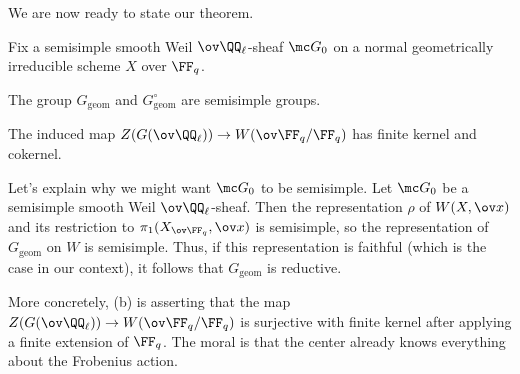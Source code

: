 \documentclass[../notes.tex]{subfiles}
\begin{document}
We are now ready to state our theorem.
\begin{theorem} \label{thm:semisimple-monodromy}
	Fix a semisimple smooth Weil $\ov\QQ_\ell$-sheaf $\mc G_0$ on a normal geometrically irreducible sch\-eme $X$ over $\FF_q$.
	\begin{listalph}
		\item The group $G_{\mathrm{geom}}$ and $G_{\mathrm{geom}}^\circ$ are semisimple groups.
		\item The induced map $Z(G(\ov\QQ_\ell))\to W(\ov\FF_q/\FF_q)$ has finite kernel and cokernel.
	\end{listalph}
\end{theorem}
\begin{remark}
	Let's explain why we might want $\mc G_0$ to be semisimple. Let $\mc G_0$ be a semisimple smooth Weil $\ov\QQ_\ell$-sheaf. Then the representation $\rho$ of $W(X,\ov x)$ and its restriction to $\pi_1(X_{\ov\FF_q},\ov x)$ is semisimple, so the representation of $G_{\mathrm{geom}}$ on $W$ is semisimple. Thus, if this representation is faithful (which is the case in our context), it follows that $G_{\mathrm{geom}}$ is reductive.
\end{remark}
\begin{remark}
	More concretely, (b) is asserting that the map $Z(G(\ov\QQ_\ell))\to W(\ov\FF_q/\FF_q)$ is surjective with finite kernel after applying a finite extension of $\FF_q$. The moral is that the center already knows everything about the Frobenius action.
\end{remark}
\end{document}
